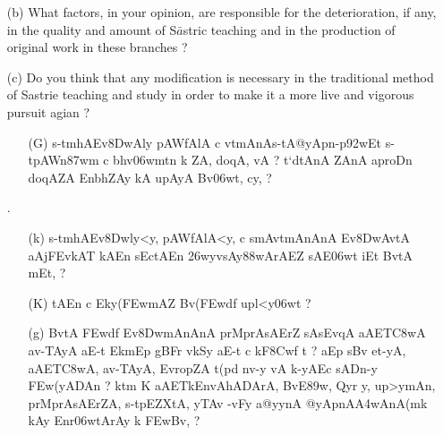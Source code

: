 {\begin{itemize}
\begin{itemize}
                 \item[(b)] What factors, in your opinion, are responsible for the deterioration, if any, in the quality and amount of S$\bar{a}$stric teaching and in the production of original work in these branches ?
                 
                 \item[(c)] Do you think that any modification is necessary in the traditional method of Sastrie teaching and study in order to make it a more live and vigorous pursuit agian ?
\end{itemize}
\end{itemize}
}
 
\begin{itemize} 
\item[]		 \begin{itemize}
                  \item[({\dn G})] {\dn s\2-tmhAEv\38DwAly\? pAWfAlA c vt\0mAnA\break s\2-tA@yApn{\rs -\re}p\392wEt s\2-tpAWn\387wm\? c bhv\306wmt\?n k\? ZA, doqA, vA {\rs ?\re} t`dtAnA\2 ZAnA aproD\?n doqAZA\2 Enbh\0ZAy kA upAyA Bv\306wt, cy\?, {\rs ?\re} }
 
 \end{itemize}
 
 \item[{\dn \dnnum \rn{18}} .]\begin{itemize}
               
               \item[({\dn k})] {\dn s\2-tmhAEv\38Dwly\?<y, pAWfAlA<y, c smAvt\0\-mAnAnA\2 Ev\38DwAvtA aAjFEvkAT\0 kAEn sEctAEn \326wyvsAy\388wArAEZ sAE\306wt iEt BvtA\2 mEt, {\rs ?\re}}
               
               \item[({\dn K})] {\dn tAEn c Eky(\3FEwmAZ\2 Bv(\3FEwd\?f\? upl<y\306wt\? {\rs ?\re}}
 
               \item[({\dn g})] {\dn BvtA\2 \3FEwd\?f\? Ev\38DwmAnAnA\2 prMprAsAErZ\2 sA\2s\-EvqA aAET\3C8wA av-TAyA aE-t EkmEp gBFr\2 v\4kSy aE-t c\? kF\38Cwf\2 t {\rs ?\re} aEp s\2Bv\? et-yA, aAET\0\3C8wA, av-TAyA, EvropZA t(pd\? nv-y vA k-yAEc sADn-y \3FEw(yADAn {\rs ?\re} ktm\? K aAET\2kEnvA\0hADArA, BvE\389w, Qy\?r y\4, up>ymAn\4, prMprAsAErZA, s\2-tpEZXtA, yTAv{\rdt} -vFy a@yynA @yApnA\3A4wAnA(mk\2 kAy{\rdt} Enr\306wtArAy\2 k\0 \3FEwBv\?, {\rs ?\re}} 
               

\end{itemize}
\end{itemize}
